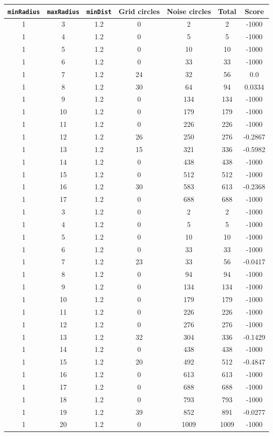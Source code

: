 \documentclass[letterpaper, 12pt]{article}
\begin{document}
\begin{longtable}{|c|c|c|c|c|c|c|}
\hline
\textbf{\texttt{minRadius}} & \textbf{\texttt{maxRadius}} & \textbf{\texttt{minDist}} & \textbf{Grid circles} & \textbf{Noise circles} & \textbf{Total} & \textbf{Score} \\
\hline
1 & 3 & 1.2 & 0 & 2 & 2 & -1000 \\
\hline
1 & 4 & 1.2 & 0 & 5 & 5 & -1000 \\
\hline
1 & 5 & 1.2 & 0 & 10 & 10 & -1000 \\
\hline
1 & 6 & 1.2 & 0 & 33 & 33 & -1000 \\
\hline
1 & 7 & 1.2 & 24 & 32 & 56 & 0.0 \\
\hline
1 & 8 & 1.2 & 30 & 64 & 94 & 0.0334 \\
\hline
1 & 9 & 1.2 & 0 & 134 & 134 & -1000 \\
\hline
1 & 10 & 1.2 & 0 & 179 & 179 & -1000 \\
\hline
1 & 11 & 1.2 & 0 & 226 & 226 & -1000 \\
\hline
1 & 12 & 1.2 & 26 & 250 & 276 & -0.2867 \\
\hline
1 & 13 & 1.2 & 15 & 321 & 336 & -0.5982 \\
\hline
1 & 14 & 1.2 & 0 & 438 & 438 & -1000 \\
\hline
1 & 15 & 1.2 & 0 & 512 & 512 & -1000 \\
\hline
1 & 16 & 1.2 & 30 & 583 & 613 & -0.2368 \\
\hline
1 & 17 & 1.2 & 0 & 688 & 688 & -1000 \\
\hline
1 & 3 & 1.2 & 0 & 2 & 2 & -1000 \\
\hline
1 & 4 & 1.2 & 0 & 5 & 5 & -1000 \\
\hline
1 & 5 & 1.2 & 0 & 10 & 10 & -1000 \\
\hline
1 & 6 & 1.2 & 0 & 33 & 33 & -1000 \\
\hline
1 & 7 & 1.2 & 23 & 33 & 56 & -0.0417 \\
\hline
1 & 8 & 1.2 & 0 & 94 & 94 & -1000 \\
\hline
1 & 9 & 1.2 & 0 & 134 & 134 & -1000 \\
\hline
1 & 10 & 1.2 & 0 & 179 & 179 & -1000 \\
\hline
1 & 11 & 1.2 & 0 & 226 & 226 & -1000 \\
\hline
1 & 12 & 1.2 & 0 & 276 & 276 & -1000 \\
\hline
1 & 13 & 1.2 & 32 & 304 & 336 & -0.1429 \\
\hline
1 & 14 & 1.2 & 0 & 438 & 438 & -1000 \\
\hline
1 & 15 & 1.2 & 20 & 492 & 512 & -0.4847 \\
\hline
1 & 16 & 1.2 & 0 & 613 & 613 & -1000 \\
\hline
1 & 17 & 1.2 & 0 & 688 & 688 & -1000 \\
\hline
1 & 18 & 1.2 & 0 & 793 & 793 & -1000 \\
\hline
1 & 19 & 1.2 & 39 & 852 & 891 & -0.0277 \\
\hline
1 & 20 & 1.2 & 0 & 1009 & 1009 & -1000 \\
\hline
\end{longtable}
\end{document}
